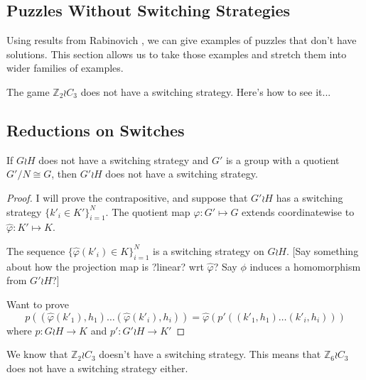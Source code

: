 \subsection{Puzzles Without Switching Strategies}
Using results from Rabinovich \cite{Rabinovich2022}, we can give examples of
puzzles that don't have solutions. This section allows us to take those examples
and stretch them into wider families of examples.

\begin{example}
  The game $\mathbb Z_2 \wr C_3$ does not have a switching strategy. Here's how to see it...
  \label{ex:NoSolutionZ2C3}
\end{example}

\subsection{Reductions on Switches}
\begin{theorem}
  If $G \wr H$ does not have a switching strategy and $G'$ is a group with
  a quotient $G'/N \cong G$, then ${G'} \wr H$ does not have a switching
  strategy.
  \label{thm:SwitchReduction}
\end{theorem}
\begin{proof}
  I will prove the contrapositive, and suppose that $G' \wr H$ has a
  switching strategy $\{k'_i \in K'\}_{i=1}^N$. The quotient map
  $\varphi\colon G' \mapsto G$
  extends coordinatewise to
  $\hat\varphi \colon K' \mapsto K$.

  The sequence $\{\hat\varphi(k'_i) \in K\}_{i=1}^N$ is a switching strategy on
  $G \wr H$.
  [Say something about how the projection map is ?linear? wrt $\hat\varphi$?
  Say $\phi$ induces a homomorphism from $G' \wr H$?]

  Want to prove \[
    p((\hat\varphi(k'_1),h_1)\dots(\hat\varphi(k'_i),h_i)) =
    \hat\varphi(p'((k'_1,h_1)\dots(k'_i,h_i)))
  \] where $p \colon G \wr H \rightarrow K$ and $p' \colon G' \wr H \rightarrow K'$
\end{proof}
\begin{example}
  We know that $\mathbb Z_2 \wr C_3$ doesn't have a switching strategy.
  This means that $\mathbb Z_6 \wr C_3$ does not have a switching strategy either.
\end{example}

